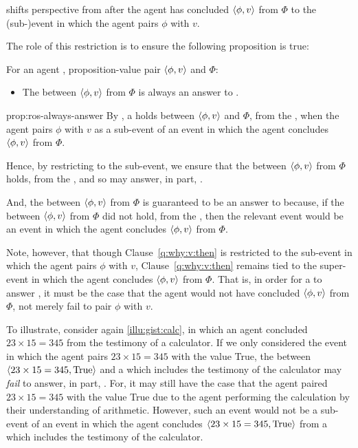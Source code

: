 \begin{note}
  \qWhyV{} shifts perspective from after the agent has concluded \(\langle \phi, v \rangle\) from \(\Phi\) to the (sub-)event in which the agent pairs \(\phi\) with \(v\).

  The role of this restriction is to ensure the following proposition is true:

  \begin{proposition}
    \label{prop:ros-always-answer}
    For an agent \vAgent{}, proposition-value pair \(\langle \phi, v \rangle\) and \poP{} \(\Phi\):

    \begin{itemize}
    \item
      The \ros{} between \(\langle \phi, v \rangle\) from \(\Phi\) is always an answer to \qWhyV{}.
    \end{itemize}
    \vspace{-\baselineskip}
  \end{proposition}

  \begin{argument}{prop:ros-always-answer}
    By \supportI{}, a \ros{} holds between \(\langle \phi, v \rangle\) and \(\Phi\), from the \agpe{}, when the agent pairs \(\phi\) with \(v\) as a sub-event of an event in which the agent concludes \(\langle \phi, v \rangle\) from \(\Phi\).

    Hence, by restricting \qWhyV{} to the sub-event, we ensure that the \ros{} between \(\langle \phi, v \rangle\) from \(\Phi\) holds, from the \agpe{}, and so may answer, in part, \qWhyV{}.

    And, the \ros{} between \(\langle \phi, v \rangle\) from \(\Phi\) is guaranteed to be an answer to \qWhyV{} because, if the \ros{} between \(\langle \phi, v \rangle\) from \(\Phi\) did not hold, from the \agpe{}, then the relevant event would be an event in which the agent concludes \(\langle \phi, v \rangle\) from \(\Phi\).
    \end{argument}


  Note, however, that though Clause~\ref{q:why:v:then} is restricted to the sub-event in which the agent pairs \(\phi\) with \(v\), Clause~\ref{q:why:v:then} remains tied to the super-event in which the agent concludes \(\langle \phi, v \rangle\) from \(\Phi\).
  That is, in order for a \ros{} to answer \qWhyV{}, it must be the case that the agent would not have concluded \(\langle \phi, v \rangle\) from \(\Phi\), not merely fail to pair \(\phi\) with \(v\).

  To illustrate, consider again \autoref{illu:gist:calc}, in which an agent concluded \(23 \times 15 = 345\) from the testimony of a calculator.
  If we only considered the event in which the agent pairs \(23 \times 15 = 345\) with the value True, the \ros{} between \(\langle 23 \times 15 = 345, \text{True} \rangle\) and a \poP{} which includes the testimony of the calculator may \emph{fail} to answer, in part, \qWhyV{}.
  For, it may still have the case that the agent paired \(23 \times 15 = 345\) with the value True due to the agent performing the calculation by their understanding of arithmetic.
  However, such an event would not be a sub-event of an event in which the agent concludes \(\langle 23 \times 15 = 345, \text{True} \rangle\) from a \poP{} which includes the testimony of the calculator.
\end{note}

